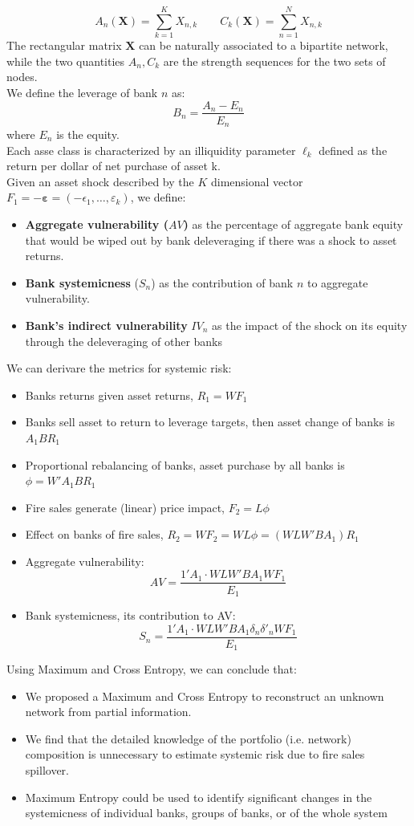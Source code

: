 \[
A_n(\mathbf{X}) = \sum_{k=1}^{K} X_{n,k} \qquad C_k(\mathbf{X}) = \sum_{n=1}^{N} X_{n,k}
\]
The rectangular matrix $\mathbf{X}$ can be naturally associated to a bipartite network, while the two quantities $A_n, C_k$ are the strength sequences for the two sets of nodes.\\
We define the leverage of bank $n$ as:
\[
B_n = \frac{A_n - E_n}{E_n}
\] where $E_n$ is the equity.\\
Each asse class is characterized by an illiquidity parameter $\ell_k$ defined as the return per dollar of net purchase of asset k.\\
Given an asset shock described by the $K$ dimensional vector $F_1 = -\mathbf{\varepsilon} = (-\epsilon_1,\ldots,\varepsilon_k) $, we define:
\begin{itemize}
	\item \textbf{Aggregate vulnerability ($AV$)} as the percentage of aggregate bank equity that would be wiped out by bank deleveraging if there was a shock to asset returns. 
	\item \textbf{Bank systemicness} ($S_n$) as the contribution of bank $n$ to aggregate vulnerability. \item \textbf{Bank’s indirect vulnerability} $IV_n$ as the impact of the shock on its equity through the deleveraging of other banks
\end{itemize}
We can derivare the metrics for systemic risk:
\begin{mydefinition}
	\begin{itemize}
		\item Banks returns given asset returns, $R_1 = WF_1$
		\item Banks sell asset to return to leverage targets, then asset change of banks is $A_1BR_1$
		\item Proportional rebalancing of banks, asset purchase by all banks is $\phi = W'A_1BR_1$
		\item Fire sales generate (linear) price impact, $F_2 = L\phi$
		\item Effect on banks of fire sales, $R_2 = WF_2 = WL\phi = (WLW'BA_1)R_1$
		\item Aggregate vulnerability:
		\[
		AV = \frac{1'A_1 \cdot WLW'BA_1WF_1}{E_1}
		\]
		\item Bank systemicness, its contribution to AV:
		\[
		S_n = \frac{1'A_1 \cdot WLW'BA_1 \delta_n \delta'_nWF_1}{E_1}
		\]
	\end{itemize}
\end{mydefinition}
Using Maximum and Cross Entropy, we can conclude that:
\begin{itemize}
	\item We proposed a Maximum and Cross Entropy to reconstruct an unknown network from partial information.
	\item We find that the detailed knowledge of the portfolio (i.e. network) composition is unnecessary to estimate systemic risk due to fire sales spillover.
	\item Maximum Entropy could be used to identify significant changes in the systemicness of individual banks, groups of banks, or of the whole system
\end{itemize}
